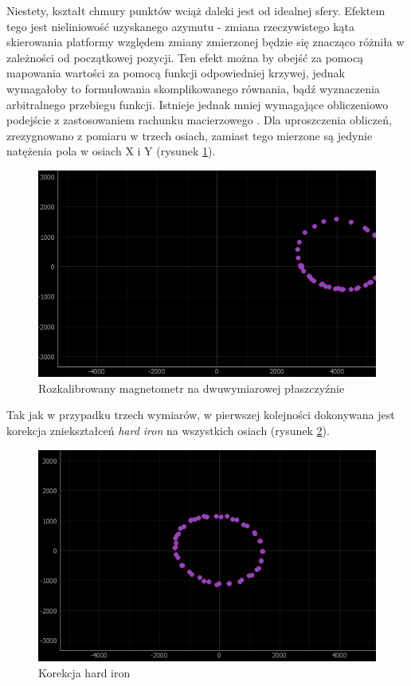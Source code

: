 Niestety, kształt chmury punktów wciąż daleki jest od idealnej sfery. Efektem tego jest nieliniowość uzyskanego azymutu - zmiana rzeczywistego kąta skierowania platformy względem zmiany zmierzonej będzie się znacząco różniła w zależności od początkowej pozycji. Ten efekt można by obejść za pomocą mapowania wartości za pomocą funkcji odpowiedniej krzywej, jednak wymagałoby to formułowania skomplikowanego równania, bądź wyznaczenia arbitralnego przebiegu funkcji. Istnieje jednak mniej wymagające obliczeniowo podejście z zastosowaniem rachunku macierzowego \cite{hard-soft-iron}. Dla uproszczenia obliczeń, zrezygnowano z pomiaru w trzech osiach, zamiast tego mierzone są jedynie natężenia pola w osiach X i Y (rysunek \ref{fig:2d-mag-no-cal}).

\begin{figure}[H]
	\centering
		\includegraphics[width=0.6\linewidth]{rys/ScanBot-08-2d-calibration-theta-sigma.PNG}
	\caption{Rozkalibrowany magnetometr na dwuwymiarowej płaszczyźnie}
	\label{fig:2d-mag-no-cal}
\end{figure}

Tak jak w przypadku trzech wymiarów, w pierwszej kolejności dokonywana jest korekcja zniekształceń \emph{hard iron} na wszystkich osiach (rysunek \ref{fig:2d-mag-hard-corr-xy}).

\begin{figure}[H]
	\centering
		\includegraphics[width=0.6\linewidth]{rys/ScanBot-10-2d-calibration-theta-sigma-2-added-hard-offset-reset-data-so-soft-iron-values-are-proper.PNG}
	\caption{Korekcja hard iron}
	\label{fig:2d-mag-hard-corr-xy}
\end{figure}


